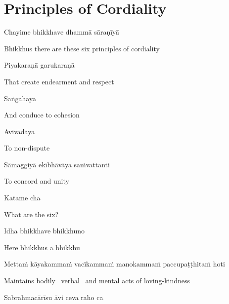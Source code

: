 \section{Principles of Cordiality}
\label{principles-of-cordiality}

\begin{leader}
\end{leader}

Chayime bhikkhave dhammā sāraṇīyā

\begin{cprenglish}
  Bhikkhus there are these six principles of cordiality
\end{cprenglish}

Piyakaraṇā garukaraṇā

\begin{cprenglish}
  That create endearment and respect
\end{cprenglish}

Saṅgahāya

\begin{cprenglish}
  And conduce to cohesion
\end{cprenglish}

Avivādāya

\begin{cprenglish}
  To non-dispute
\end{cprenglish}

Sāmaggiyā ekībhāvāya saṁvattanti

\begin{cprenglish}
  To concord and unity
\end{cprenglish}

Katame cha

\begin{cprenglish}
  What are the six?
\end{cprenglish}

Idha bhikkhave bhikkhuno

\begin{cprenglish}
  Here bhikkhus a bhikkhu
\end{cprenglish}

Mettaṁ kāyakammaṁ vacīkammaṁ manokammaṁ paccupaṭṭhitaṁ hoti

\begin{cprenglish}
  Maintains bodily \breathmark\ verbal \breathmark\ and mental acts of loving-kindness
\end{cprenglish}

Sabrahmacārīsu āvi ceva raho ca

